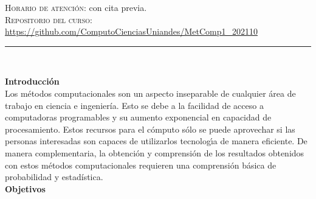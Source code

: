 \documentclass[letterpaper,10pt,onecolumn]{article}
\begin{document}
\noindent\textsc{Horario de atenci\'on:} con cita previa. 
\\[-0.1cm]

\noindent\textsc{Repositorio del curso:} \url{https://github.com/ComputoCienciasUniandes/MetComp1_202110} 






\noindent\rule{\textwidth}{1pt}\\[-0.1cm]

\addtocounter{mysection}{1}

\noindent\textbf{\large {} \quad Introducci\'on}\\[-0.2cm]


\noindent\normalsize Los m\'etodos computacionales son un aspecto
inseparable de cualquier \'area de trabajo en ciencia e ingenier\'ia.
Esto se debe a la facilidad de acceso a computadoras programables  y
su aumento exponencial en capacidad de procesamiento.  
Estos recursos para el c\'omputo s\'olo se puede aprovechar si las
personas interesadas son capaces de utilizarlos tecnolog\'{\i}a
de manera eficiente.
De manera complementaria, la obtenci\'on y comprensi\'on de los
resultados obtenidos  con estos m\'etodos computacionales requieren
una comprensi\'on b\'asica de probabilidad y estad\'istica. \\[0.1cm]  

\noindent\textbf{\large {} \quad Objetivos}\\[-0.2cm]
\end{document}
